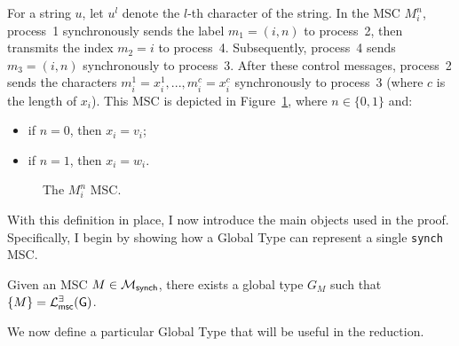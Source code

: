 \bigskip

\begin{definition}[$M^n_i$]\label{def:mni}
	For a string $u$, let $u^l$ denote the $l$-th character of the string.
	In the MSC $M^n_i$, process~1 synchronously sends the label
	$m_1 = (i, n)$ to process~2, then transmits the index $m_2=i$
	to process~4. Subsequently, process~4 sends $m_3 = (i, n)$
	synchronously to process~3. After these control messages, process~2
	sends the characters $m_i^1 = x_i^1,..., m_i^c = x_i^c$
	synchronously to process~3 (where $c$ is the length of $x_i$).
	This MSC is depicted in Figure~\ref{fig:mni}, where $n\in\{0,1\}$ and:
	\begin{itemize}
		\item if $n=0$, then $x_i=v_i$;
		\item if $n=1$, then $x_i=w_i$.
	\end{itemize}

	\begin{figure}[!ht]
		\centering
		\begin{msc}[draw frame=none, draw head=none, msc keyword=, head height=0px, label distance=0.5ex, foot height=0px, foot distance=0px]{}

		\end{msc}
		\caption{The $M_i^n$ MSC.}
		\label{fig:mni}
	\end{figure}

\end{definition}

With this definition in place, I now introduce the main objects used 
in the proof. Specifically, I begin by showing how a Global Type can 
represent a single \verb|synch| MSC.

\bigskip

\begin{definition}[$G_M$]\label{def:gm}
	Given an MSC $M\in \mathcal{M}_{\mathsf{synch}}$, there exists a
	global type $G_M$ such that $\{M\} = \mathcal{L}_{\mathsf{msc}}^{\exists}(\mathsf{G})$.
\end{definition}

We now define a particular Global Type that will be useful in the reduction.

